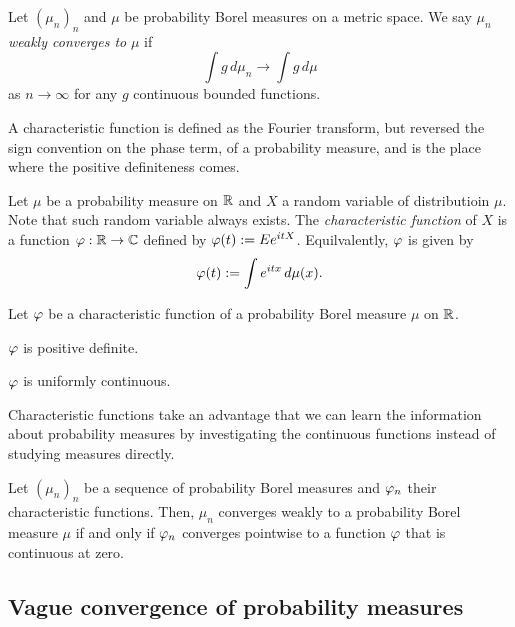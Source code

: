 \documentclass[12pt]{article}
\begin{document}
\begin{defn}
Let $(\mu_n)_n$ and $\mu$ be probability Borel measures on a metric space.
We say $\mu_n$ \emph{weakly converges to} $\mu$ if
\[\int g\,d\mu_n\to\int g\,d\mu\]
as $n\to\infty$ for any $g$ continuous bounded functions.
\end{defn}

A characteristic function is defined as the Fourier transform, but reversed the sign convention on the phase term, of a probability measure, and is the place where the positive definiteness comes.

\begin{defn}
Let $\mu$ be a probability measure on $\mathbb{R}$ and $X$ a random variable of distributioin $\mu$.
Note that such random variable always exists.
The \emph{characteristic function} of $X$ is a function $\varphi:\mathbb{R}\to\mathbb{C}$ defined by $\varphi(t):=Ee^{itX}$.
Equilvalently, $\varphi$ is given by
\[\varphi(t):=\int e^{itx}\,d\mu(x).\]
\end{defn}
\begin{prop}
Let $\varphi$ be a characteristic function of a probability Borel measure $\mu$ on $\mathbb{R}$.
\begin{parts}
\item $\varphi$ is positive definite.
\item $\varphi$ is uniformly continuous.
\end{parts}
\end{prop}
\begin{pf}
\end{pf}

Characteristic functions take an advantage that we can learn the information about probability measures by investigating the continuous functions instead of studying measures directly.



\begin{thm}
Let $(\mu_n)_n$ be a sequence of probability Borel measures and $\varphi_n$ their characteristic functions.
Then, $\mu_n$ converges weakly to a probability Borel measure $\mu$ if and only if $\varphi_n$ converges pointwise to a function $\varphi$ that is continuous at zero.
\end{thm}
\begin{pf}
\end{pf}



\subsection{Vague convergence of probability measures}
\end{document}
